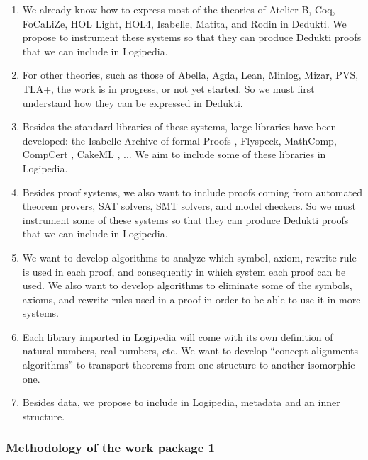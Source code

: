 \begin{enumerate}
\item We already know how to express most of the theories of {\sc Atelier B},
{\sc Coq}, {\sc FoCaLiZe}, {\sc HOL Light}, {\sc HOL4}, {\sc
Isabelle}, {\sc Matita}, and {\sc Rodin} in {\sc Dedukti}. We propose
to instrument these systems so that they can produce {\sc Dedukti}
proofs that we can include in {\sc Logipedia}.

\item
For other theories, such as those of {\sc Abella}, {\sc Agda}, {\sc
Lean}, {\sc Minlog}, {\sc Mizar}, {\sc PVS}, {\sc TLA+}, the work is
in progress, or not yet started.  So we must first understand how they
can be expressed in {\sc Dedukti}.

\item Besides the standard libraries of these systems, large libraries
  have been developed: the {\sc Isabelle Archive of formal Proofs} \cite{AFP},
  {\sc Flyspeck}\cite{Flyspeck}, {\sc MathComp}\cite{Mathcomp}, 
  {\sc CompCert} \cite{Compcert}, {\sc CakeML} \cite{CakeML}, ...  We aim to include
  some of these libraries in {\sc Logipedia}.
  
\item
Besides proof systems, we also want to include proofs coming from
automated theorem provers, SAT solvers, SMT solvers, and model
checkers.  So we must instrument some of these systems so that they
can produce {\sc Dedukti} proofs that we can include in {\sc
Logipedia}.

\item
We want to develop algorithms to analyze which symbol, axiom, rewrite
rule is used in each proof, and consequently in which system each proof
can be used. We also want to develop algorithms to eliminate some of the 
symbols, axioms, and rewrite rules used in a proof in order to be able to 
use it in more systems.


\item
Each library imported in {\sc Logipedia} will come with its own
definition of natural numbers, real numbers, etc. We want to develop
``concept alignments algorithms'' to transport theorems from one
structure to another isomorphic one.

\item 
Besides data, we propose to include in {\sc Logipedia}, metadata and
an inner structure.
\end{enumerate}


\subsubsection{Methodology of the work package 1}

